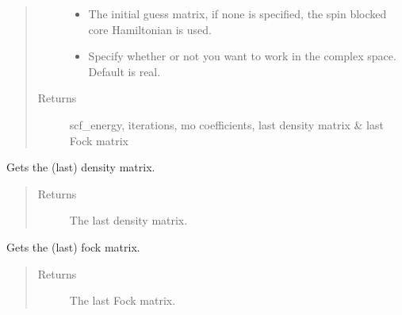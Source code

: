 \documentclass[letterpaper,10pt,english]{sphinxmanual}
\begin{document}
\begin{fulllineitems}
\begin{fulllineitems}
\begin{quote}
\begin{description}
\begin{itemize}
\item {} 
 \textendash{} The initial guess matrix, if none is specified, the spin blocked core Hamiltonian is used.

\item {} 
 \textendash{} Specify whether or not you want to work in the complex space. Default is real.

\end{itemize}

\item[{Returns}] \leavevmode
scf\_energy, iterations, mo coefficients, last density matrix \& last Fock matrix

\end{description}\end{quote}

\end{fulllineitems}


\begin{fulllineitems}
\label{\detokenize{GHF:hf.HartreeFock.GHF.MF.get_dens}}
Gets the (last) density matrix.
\begin{quote}\begin{description}
\item[{Returns}] \leavevmode
The last density matrix.

\end{description}\end{quote}

\end{fulllineitems}


\begin{fulllineitems}
\label{\detokenize{GHF:hf.HartreeFock.GHF.MF.get_fock}}
Gets the (last) fock matrix.
\begin{quote}\begin{description}
\item[{Returns}] \leavevmode
The last Fock matrix.

\end{description}\end{quote}


\end{fulllineitems}
\end{fulllineitems}
\end{document}
